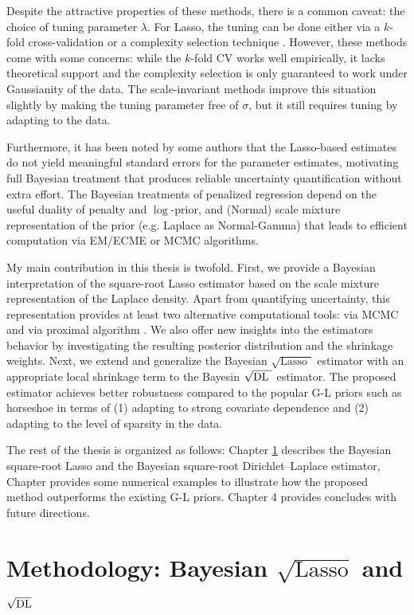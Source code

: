 \documentclass[chapters]{uamaththesis}
\def\sql{$\sqrt{\text{Lasso }}$}
\def\sqdl{$\sqrt{\text{\rm{DL} }}$}
\begin{document}
Despite the attractive properties of these methods, there is a common caveat: the choice of tuning parameter $\lambda$. For Lasso, the tuning can be done either via a $k$-fold cross-validation or a complexity selection technique \citep{giraud2012high}. However, these methods come with some concerns: while the $k$-fold CV works well empirically, it lacks theoretical support and the complexity selection is only guaranteed to work under Gaussianity of the data. The scale-invariant methods improve this situation slightly by making the tuning parameter free of $\sigma$, but it still requires tuning by adapting to the data. 

Furthermore, it has been noted by some authors \citep{chatterjee2011bootstrap} that the Lasso-based estimates do not yield meaningful standard errors for the parameter estimates, motivating full Bayesian treatment that produces reliable uncertainty quantification without extra effort. The Bayesian treatments of penalized regression depend on the useful duality of penalty and $\log$-prior, and (Normal) scale mixture representation of the prior (e.g. Laplace as Normal-Gamma) that leads to efficient computation via EM/ECME or MCMC algorithms. 

My main contribution in this thesis is twofold. First, we provide a Bayesian interpretation of the square-root Lasso estimator based on the scale mixture representation of the Laplace density. Apart from quantifying uncertainty, this representation provides at least two alternative computational tools: via MCMC and via proximal algorithm \citep{polson2015proximal}. We also offer new insights into the estimators behavior by investigating the resulting posterior distribution and the shrinkage weights. Next, we extend and generalize the Bayesian \sql{} estimator with an appropriate local shrinkage term to the Bayesin \sqdl{} estimator. The proposed estimator achieves better robustness compared to the popular G-L priors such as horseshoe in terms of (1) adapting to strong covariate dependence and (2) adapting to the level of sparsity in the data. 

The rest of the thesis is organized as follows: Chapter \ref{ch:2} describes the Bayesian square-root Lasso and the Bayesian square-root Dirichlet--Laplace estimator, Chapter provides some numerical examples to illustrate how the proposed method outperforms the existing G-L priors. Chapter 4 provides concludes with future directions.  



\chapter{Methodology: Bayesian $\sqrt{\text{Lasso}}$ and $\sqrt{\text{\rm{DL}}}$ }\label{ch:2}
\end{document}
